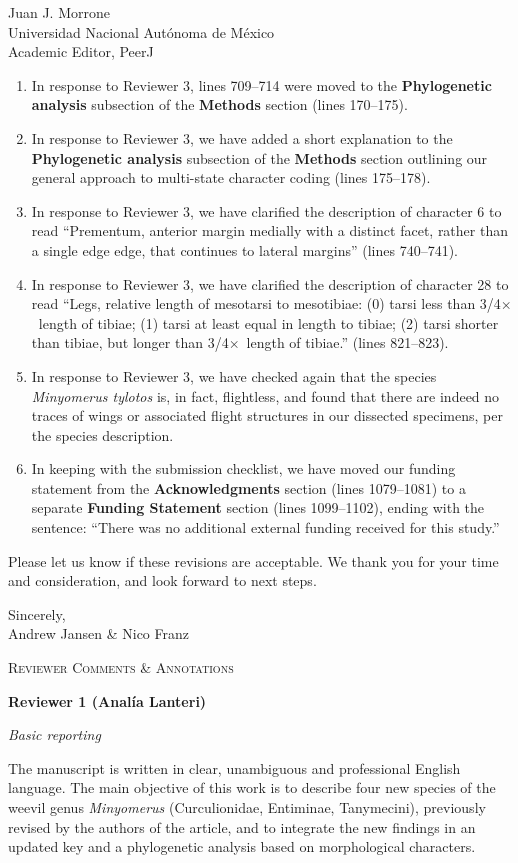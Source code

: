 \documentclass[10pt,letterpaper]{letter}
\newcommand{\x}{$\times$~}
\begin{document}
\begin{letter}{Juan J. Morrone\\Universidad Nacional Aut\'{o}noma de M\'{e}xico\\Academic Editor, PeerJ}
\begin{enumerate}
		\item In response to Reviewer 3, lines 709--714 were moved to the \textbf{Phylogenetic analysis} subsection of the \textbf{Methods} section (lines 170--175).
		\item In response to Reviewer 3, we have added a short explanation to the \textbf{Phylogenetic analysis} subsection of the \textbf{Methods} section outlining our general approach to multi-state character coding (lines 175--178).
		\item In response to Reviewer 3, we have clarified the description of character 6 to read ``Prementum, anterior margin medially with a distinct facet, rather than a single edge edge, that continues to lateral margins'' (lines 740--741).
		\item In response to Reviewer 3, we have clarified the description of character 28 to read ``Legs, relative length of mesotarsi to mesotibiae: (0) tarsi less than 3/4\x length of tibiae; (1) tarsi at least equal in length to tibiae; (2) tarsi shorter than tibiae, but longer than 3/4\x length of tibiae.'' (lines 821--823).
		\item In response to Reviewer 3, we have checked again that the species \textit{Minyomerus tylotos} is, in fact, flightless, and found that there are indeed no traces of wings or associated flight structures in our dissected specimens, per the species description.
		\item In keeping with the submission checklist, we have moved our funding statement from the \textbf{Acknowledgments} section (lines 1079--1081) to a separate \textbf{Funding Statement} section (lines 1099--1102), ending with the sentence: ``There was no additional external funding received for this study.''
	\end{enumerate}

	Please let us know if these revisions are acceptable.
	We thank you for your time and consideration, and look forward to next steps.

	\closing{Sincerely,\\Andrew Jansen \& Nico Franz}
	
	\newpage
	\textsc{Reviewer Comments \& Annotations}
	
	\textbf{Reviewer 1 (Anal\'{i}a Lanteri)}
	
	\emph{Basic reporting}
	
	The manuscript is written in clear, unambiguous and professional English language. 
	The main objective of this work is to describe four new species of the weevil genus \textit{Minyomerus} (Curculionidae, Entiminae, Tanymecini), previously revised by the authors of the article, and to integrate the new findings in an updated key and a phylogenetic analysis based on morphological characters.
	

\end{letter}
\end{document}
